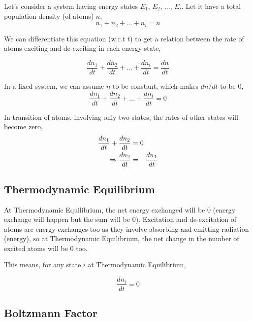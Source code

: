 \documentclass[12pt]{article}
\begin{document}
Let's consider a system having energy states $E_{1}$, $E_{2}$, ..., $E_{i}$. Let it have a total population density (of atoms) $n$,
\begin{equation}
    n_{1} + n_{2} + ... + n_{i} = n
\end{equation}

We can differentiate this equation (w.r.t $t$) to get a relation between the rate of atoms exciting and de-exciting in each energy state,

\begin{equation*}
    \frac{dn_{1}}{dt} + \frac{dn_{2}}{dt} + ... + \frac{dn_{i}}{dt} = \frac{dn}{dt}
\end{equation*}

In a fixed system, we can assume $n$ to be constant, which makes $dn/dt$ to be 0,
\begin{equation*}
    \frac{dn_{1}}{dt} + \frac{dn_{2}}{dt} + ... + \frac{dn_{i}}{dt} = 0
\end{equation*} 

In transition of atoms, involving only two states, the rates of other states will become zero,
\begin{align}
    \frac{dn_{1}}{dt} + \frac{dn_{2}}{dt} & = 0 \notag \\
    \Rightarrow \frac{dn_{2}}{dt} & = -\frac{dn_{1}}{dt}
\end{align}

\subsection{Thermodynamic Equilibrium}

At Thermodynamic Equilibrium, the net energy exchanged will be 0 (energy exchange will happen but the sum will be 0). Excitation and de-excitation of atoms are energy exchanges too as they involve absorbing and emitting radiation (energy), so at Thermodynamic Equilibrium, the net change in the number of excited atoms will be 0 too. \vspace{.2cm}

This means, for any state $i$ at Thermodynamic Equilibrium, 

\begin{equation}
    \frac{dn_{i}}{dt} = 0
\end{equation}

\subsection{Boltzmann Factor}
\end{document}
